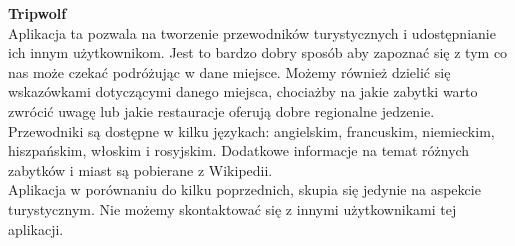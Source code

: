     \textbf{Tripwolf} \\ 
    Aplikacja ta pozwala na tworzenie przewodników turystycznych i udostępnianie ich innym użytkownikom. Jest to bardzo dobry sposób aby zapoznać się z tym co nas może czekać podróżując w dane miejsce. Możemy również dzielić się wskazówkami dotyczącymi danego miejsca, chociażby na jakie zabytki warto zwrócić uwagę lub jakie restauracje oferują dobre regionalne jedzenie. Przewodniki są dostępne w kilku językach: angielskim, francuskim, niemieckim, hiszpańskim, włoskim i rosyjskim. Dodatkowe informacje na temat różnych zabytków i miast są pobierane z Wikipedii. \\
    Aplikacja w porównaniu do kilku poprzednich, skupia się jedynie na aspekcie turystycznym. Nie możemy skontaktować się z innymi użytkownikami tej aplikacji.
